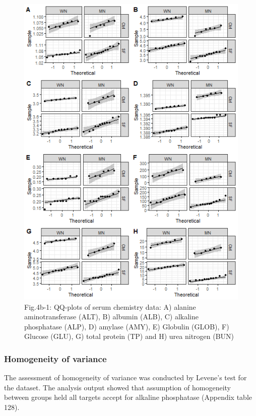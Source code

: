 \documentclass[
  12pt,
  letterpaper,
]{article}
\begin{document}
\begin{figure}[H]

{\centering \includegraphics[width=0.95\linewidth,]{Statistics_Report_files/figure-latex/qq-plot-figure-4b-1} 

}

\caption{Fig.4b-1: QQ-plots of serum chemistry data: A) alanine aminotransferase (ALT), B) albumin (ALB), C) alkaline phosphatase (ALP), D) amylase (AMY), E) Globulin (GLOB), F) Glucose (GLU), G) total protein (TP) and H) urea nitrogen (BUN)}\label{fig:qq-plot-figure-4b}
\end{figure}

\subsubsection{Homogeneity of variance}\label{homogeneity-of-variance-3}

The assessment of homogeneity of variance was conducted by Levene's test for the dataset. The analysis output showed that assumption of homogeneity between groups held all targets accept for alkaline phosphatase (Appendix table 128).
\end{document}
